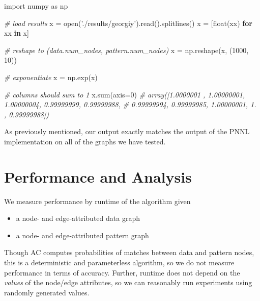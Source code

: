 \documentclass[10pt,oneside]{memoir}
\newenvironment{Shaded}{}{}
\newcommand{\BuiltInTok}[1]{#1}
\newcommand{\CommentTok}[1]{\textcolor[rgb]{0.38,0.63,0.69}{\textit{#1}}}
\newcommand{\ControlFlowTok}[1]{\textcolor[rgb]{0.00,0.44,0.13}{\textbf{#1}}}
\newcommand{\DecValTok}[1]{\textcolor[rgb]{0.25,0.63,0.44}{#1}}
\newcommand{\ImportTok}[1]{#1}
\newcommand{\KeywordTok}[1]{\textcolor[rgb]{0.00,0.44,0.13}{\textbf{#1}}}
\newcommand{\NormalTok}[1]{#1}
\newcommand{\OperatorTok}[1]{\textcolor[rgb]{0.40,0.40,0.40}{#1}}
\newcommand{\StringTok}[1]{\textcolor[rgb]{0.25,0.44,0.63}{#1}}
\providecommand{\tightlist}{%
  \setlength{\itemsep}{0pt}\setlength{\parskip}{0pt}}
\begin{document}
\begin{Shaded}
\begin{Highlighting}[]
\ImportTok{import}\NormalTok{ numpy }\ImportTok{as}\NormalTok{ np}

\CommentTok{# load results}
\NormalTok{x }\OperatorTok{=} \BuiltInTok{open}\NormalTok{(}\StringTok{'./results/georgiy'}\NormalTok{).read().splitlines()}
\NormalTok{x }\OperatorTok{=}\NormalTok{ [}\BuiltInTok{float}\NormalTok{(xx) }\ControlFlowTok{for}\NormalTok{ xx }\KeywordTok{in}\NormalTok{ x]}

\CommentTok{# reshape to (data.num_nodes, pattern.num_nodes)}
\NormalTok{x }\OperatorTok{=}\NormalTok{ np.reshape(x, (}\DecValTok{1000}\NormalTok{, }\DecValTok{10}\NormalTok{))}

\CommentTok{# exponentiate}
\NormalTok{x }\OperatorTok{=}\NormalTok{ np.exp(x)}

\CommentTok{# columns should sum to 1}
\NormalTok{x.}\BuiltInTok{sum}\NormalTok{(axis}\OperatorTok{=}\DecValTok{0}\NormalTok{)}
\CommentTok{# array([1.0000001 , 1.00000001, 1.00000004, 0.99999999, 0.99999988,}
       \CommentTok{# 0.99999994, 0.99999985, 1.00000001, 1.        , 0.99999988])}
\end{Highlighting}
\end{Shaded}

As previously mentioned, our output exactly matches the output of the
PNNL implementation on all of the graphs we have tested.

\hypertarget{performance-and-analysis}{%
\section{Performance and Analysis}\label{performance-and-analysis}}

We measure performance by runtime of the algorithm given

\begin{itemize}
\tightlist
\item
  a node- and edge-attributed data graph
\item
  a node- and edge-attributed pattern graph
\end{itemize}

Though AC computes probabilities of matches between data and pattern
nodes, this is a deterministic and parameterless algorithm, so we do not
measure performance in terms of accuracy. Further, runtime does not
depend on the \emph{values} of the node/edge attributes, so we can
reasonably run experiments using randomly generated values.
\end{document}
